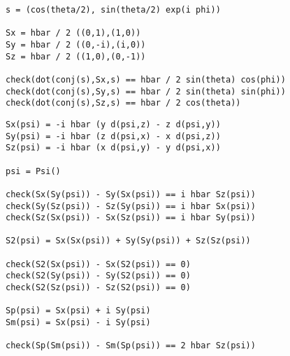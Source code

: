 
{\footnotesize\begin{verbatim}
s = (cos(theta/2), sin(theta/2) exp(i phi))

Sx = hbar / 2 ((0,1),(1,0))
Sy = hbar / 2 ((0,-i),(i,0))
Sz = hbar / 2 ((1,0),(0,-1))

check(dot(conj(s),Sx,s) == hbar / 2 sin(theta) cos(phi))
check(dot(conj(s),Sy,s) == hbar / 2 sin(theta) sin(phi))
check(dot(conj(s),Sz,s) == hbar / 2 cos(theta))
\end{verbatim}}

\newpage
{}

{\footnotesize\begin{verbatim}
Sx(psi) = -i hbar (y d(psi,z) - z d(psi,y))
Sy(psi) = -i hbar (z d(psi,x) - x d(psi,z))
Sz(psi) = -i hbar (x d(psi,y) - y d(psi,x))

psi = Psi()

check(Sx(Sy(psi)) - Sy(Sx(psi)) == i hbar Sz(psi))
check(Sy(Sz(psi)) - Sz(Sy(psi)) == i hbar Sx(psi))
check(Sz(Sx(psi)) - Sx(Sz(psi)) == i hbar Sy(psi))

S2(psi) = Sx(Sx(psi)) + Sy(Sy(psi)) + Sz(Sz(psi))

check(S2(Sx(psi)) - Sx(S2(psi)) == 0)
check(S2(Sy(psi)) - Sy(S2(psi)) == 0)
check(S2(Sz(psi)) - Sz(S2(psi)) == 0)

Sp(psi) = Sx(psi) + i Sy(psi)
Sm(psi) = Sx(psi) - i Sy(psi)

check(Sp(Sm(psi)) - Sm(Sp(psi)) == 2 hbar Sz(psi))
\end{verbatim}}


